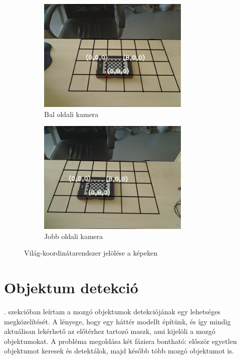 \begin{figure}[tbh]
\centering
\begin{subfigure}[b]{.49\linewidth}
	\centering
	\includegraphics[width=205pt]{figures/pose0_180.png}
	\caption{Bal oldali kamera}
  \end{subfigure}
\begin{subfigure}[b]{.49\linewidth}
	\centering
	\includegraphics[width=205pt]{figures/pose1_180.png}
	\caption{Jobb oldali kamera}
  \end{subfigure}
\caption{Világ-koordinátarendszer jelölése a képeken \label{fig:pose}}
\end{figure}

\section{Objektum detekció}



. szekcióban leírtam a mozgó objektumok detekciójának egy lehetséges megközelítését. A lényege, hogy egy háttér modellt építünk, és így mindig aktuálisan lekérhető az előtérhez tartozó maszk, ami kijelöli a mozgó objektumokat. A probléma megoldása két fázisra bontható: először egyetlen objektumot keresek és detektálok, majd később több mozgó objektumot is.

